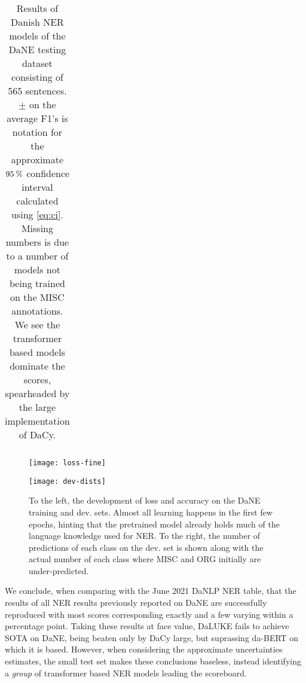 \documentclass[main.tex]{subfiles}
\begin{document}
\begin{table}[H]
\begin{center}
\begin{tabular}{l l | c c c c | c c c c}
                \end{tabular}
        \end{center}
        \caption{
            Results of Danish NER models of the DaNE \cite{hvingelby2020dane} testing dataset consisting of 565 sentences.
            $\pm$ on the average F1's is notation for the approximate $95\:\text{\%{}}$ confidence interval calculated using \eqref{eq:ci}.
        Missing numbers is due to a number of models not being trained on the MISC annotations.
        We see the transformer based models dominate the scores, spearheaded by the large implementation of DaCy.
        }
        \label{tab:DaNE}
\end{table}\noindent

\begin{figure}[H]
    \centering
    \begin{minipage}{.49\textwidth}
        \texttt{[image: loss-fine]}
    \end{minipage}\hfill
    \begin{minipage}{.49\textwidth}
        \texttt{[image: dev-dists]}
    \end{minipage}
    \caption{
        To the left, the development of loss and accuracy on the DaNE training and dev. sets.
        Almost all learning happens in the first few epochs, hinting that the pretrained model already holds much of the language knowledge used for NER.
        To the right, the number of predictions of each class on the dev. set is shown along with the actual number of each class where MISC and ORG initially are under-predicted.
    }
    \label{fig:main-fine-tune}
\end{figure}\noindent
We conclude, when comparing with the June 2021 DaNLP NER table\footnotemark \cite{danlp2021}, that the results of all NER results previously reported on DaNE are successfully reproduced with most  scores corresponding exactly and a few varying within a percentage point.
Taking these results at face value, DaLUKE fails to achieve SOTA on DaNE, being beaten only by DaCy large, but suprassing da-BERT on which it is based.
However, when considering the approximate uncertainties estimates, the small test set makes these conclusions baseless, instead identifying a \emph{group} of transformer based NER models leading the scoreboard.
\end{document}
